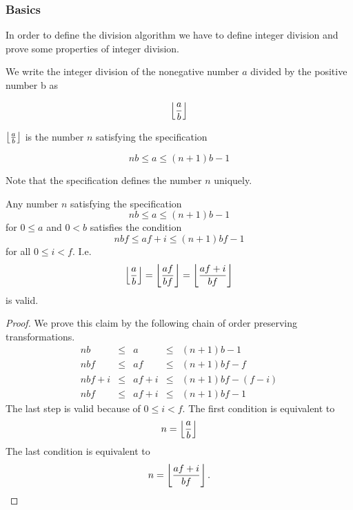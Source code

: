 \subsubsection{Basics}

In order to define the division algorithm we have to define integer division and
prove some properties of integer division.

\begin{definition}

    We write the integer division of the nonegative number $a$
    divided by the positive number {b} as

    $$\left\lfloor \frac{a}{b} \right\rfloor$$

    \noindent $\left\lfloor \frac{a}{b} \right\rfloor$ is the number $n$ satisfying the specification

    $$
    nb \le a \le (n+1) b - 1
    $$

    Note that the specification defines the number $n$ uniquely.
\end{definition}

\begin{theorem}\label{intdiv-theorem}
    Any number $n$ satisfying the specification
    $$n b \le a \le (n+1) b - 1$$
    for $0 \le a$ and $0 < b$ satisfies the condition
    $$ n b f \le a f + i \le (n+1) b f - 1 $$
    for all $0 \le i < f$. I.e.
    $$
    \left\lfloor \frac{a}{b} \right\rfloor = \left\lfloor \frac{af}{bf} \right\rfloor = \left\lfloor \frac{af + i}{bf} \right\rfloor
    $$
    is valid.

    \begin{proof}
        We prove this claim by the following chain of order preserving
        transformations.
        $$
        \begin{array}{lllll}
            n b &\le& a &\le& (n+1) b - 1
            \\
            nbf &\le& af &\le& (n+1) b f - f
            \\
            nbf + i &\le& af + i &\le& (n+1) b f - (f - i)
            \\
            nbf     &\le& af + i &\le& (n+1) b f - 1
        \end{array}
        $$
        The last step is valid because of $0 \le i < f$. The first condition is
        equivalent to
        $$ n = \left\lfloor \frac{a}{b} \right\rfloor$$
        The last condition is equivalent to
        $$ n = \left\lfloor \frac{af + i}{bf} \right\rfloor.$$
    \end{proof}
\end{theorem}


